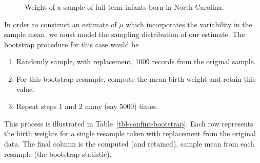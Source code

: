 \documentclass[
  letterpaper,
  DIV=11,
  numbers=noendperiod]{scrreprt}
\providecommand{\tightlist}{%
  \setlength{\itemsep}{0pt}\setlength{\parskip}{0pt}}\usepackage{longtable,booktabs,array}
\theoremstyle{definition}
\theoremstyle{definition}
\theoremstyle{plain}
\theoremstyle{remark}
\begin{document}
\begin{figure}


\caption{\label{fig-confint-histogram}Weight of a sample of full-term
infants born in North Carolina.}

\end{figure}%

In order to construct an estimate of \(\mu\) which incorporates the
variability in the sample mean, we must model the sampling distribution
of our estimate. The bootstrap procedure for this case would be

\begin{enumerate}
\def\labelenumi{\arabic{enumi}.}
\tightlist
\item
  Randomly sample, with replacement, 1009 records from the original
  sample.
\item
  For this bootstrap resample, compute the mean birth weight and retain
  this value.
\item
  Repeat steps 1 and 2 many (say 5000) times.
\end{enumerate}

This process is illustrated in Table~\ref{tbl-confint-bootstrap}. Each
row represents the birth weights for a single resample taken with
replacement from the original data. The final column is the computed
(and retained), sample mean from each resample (the bootstrap
statistic).
\end{document}
